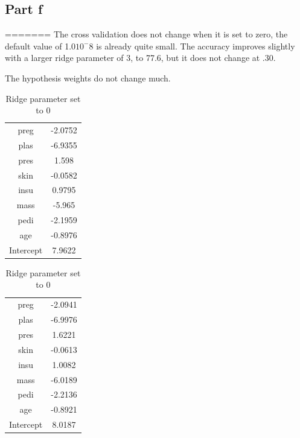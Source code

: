 \documentclass{article}
\begin{document}
\begin{table}[H]
\begin{table}[H]
\begin{table}[H]
\subsection{Part f}
=======
The cross validation does not change when it is set to zero, the default value of 1.0$10^-8$ is already quite small. The accuracy improves slightly with a larger ridge parameter of 3, to 77.6, but it does not change at .30. 

The hypothesis weights do not change  much. 


\begin{table}[h]
    \begin{center}
    \begin{tabular}{|c|c|}
   \hline
   
preg        &         -2.0752\\
plas        &         -6.9355\\
pres        &           1.598\\
skin         &        -0.0582\\
insu         &         0.9795\\
mass            &      -5.965\\
pedi              &   -2.1959\\
age                &  -0.8976\\   \hline
Intercept         &    7.9622 \\   \hline
    \end{tabular} \caption{Ridge parameter set to 0.3}
    \end{center}
\end{table}

\begin{table}[ht]
    \begin{center}
    \begin{tabular}{|c|c|}
   \hline
preg               &  -2.0941\\
plas                & -6.9976\\
pres           &       1.6221\\
skin          &       -0.0613\\
insu         &         1.0082\\
mass       &          -6.0189\\
pedi        &         -2.2136\\
age           &       -0.8921\\   \hline
Intercept     &        8.0187\\   \hline
    \end{tabular} \caption{Ridge parameter set to 0}
    \end{center}
\end{table}

\end{table}
\end{table}
\end{table}
\end{document}

